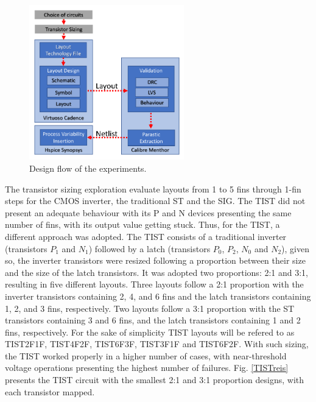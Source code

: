 \documentclass[pgmicro,diss,english]{iiufrgs}
\begin{document}
\begin{figure}[]
\centering
\includegraphics[width=0.6\textwidth, trim={0cm 0cm 0cm 0cm},clip]{designFlow.pdf}
\caption{Design flow of the experiments.}
\label{DesignFlow}
\end{figure}

The transistor sizing exploration evaluate layouts from 1 to 5 fins through 1-fin steps for the CMOS inverter, the traditional ST and the SIG. The TIST did not present an adequate behaviour with its P and N devices presenting the same number of fins, with its output value getting stuck. Thus, for the TIST, a different approach was adopted. The TIST consists of a traditional inverter (transistors $P_1$ and $N_1$) followed by a latch (transistors $P_0$, $P_2$, $N_0$ and $N_2$), given so, the inverter transistors were resized following a proportion between their size and the size of the latch transistors. It was adopted two proportions: 2:1 and 3:1, resulting in five different layouts. Three layouts follow a 2:1 proportion with the inverter transistors containing 2, 4, and 6 fins and the latch transistors containing 1, 2, and 3 fins, respectively. Two layouts follow a 3:1 proportion with the ST transistors containing 3 and 6 fins, and the latch transistors containing 1 and 2 fins, respectively. For the sake of simplicity TIST layouts will be refered to as TIST2F1F, TIST4F2F, TIST6F3F, TIST3F1F and TIST6F2F. With such sizing, the TIST worked properly in a higher number of cases, with near-threshold voltage operations presenting the highest number of failures. Fig. \ref{TISTreis} presents the TIST circuit with the smallest 2:1 and 3:1 proportion designs, with each transistor mapped.
\end{document}
